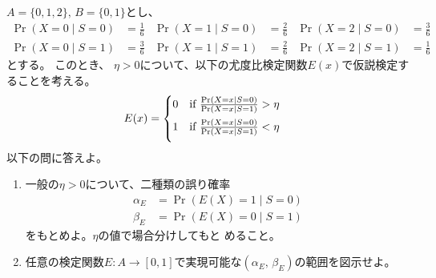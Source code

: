 \documentclass[lualatex,ja=standard,a4paper]{bxjsarticle}
\theoremstyle{definition}
\theoremstyle{remark}
\begin{document}
\vspace{1em}
$A=\{0,1,2\},\,B=\{0, 1\}$とし、
\begin{align*}
\Pr(X = 0 \mid S = 0) &= \frac16&
\Pr(X = 1 \mid S = 0) &= \frac26&
\Pr(X = 2 \mid S = 0) &= \frac36\\
\Pr(X = 0 \mid S = 1) &= \frac36&
\Pr(X = 1 \mid S = 1) &= \frac26&
\Pr(X = 2 \mid S = 1) &= \frac16
\end{align*}
とする。
このとき、 $\eta> 0$について、以下の尤度比検定関数$E(x)$で仮説検定することを考える。
\begin{align*}
E(x)&=
\begin{cases}
\vspace{.5em}
0&\text{if } \frac{\Pr(X = x\mid S = 0)}{\Pr(X = x\mid S = 1)} > \eta\\\vspace{.5em}
1&\text{if } \frac{\Pr(X = x\mid S = 0)}{\Pr(X = x\mid S = 1)} < \eta
\end{cases}
\end{align*}
以下の問に答えよ。
\begin{enumerate}
\setlength{\itemsep}{1em}
\item 一般の$\eta>0$について、二種類の誤り確率
\begin{align*}
\alpha_E&=\Pr(E(X)=1\mid S=0)\\
\beta_E&=\Pr(E(X)=0\mid S=1)
\end{align*}
をもとめよ。$\eta$の値で場合分けしてもと
めること。
\item 任意の検定関数$E\colon A\to[0,1]$で実現可能な$(\alpha_E,\, \beta_E)$の範囲を図示せよ。
\end{enumerate}
\end{document}
